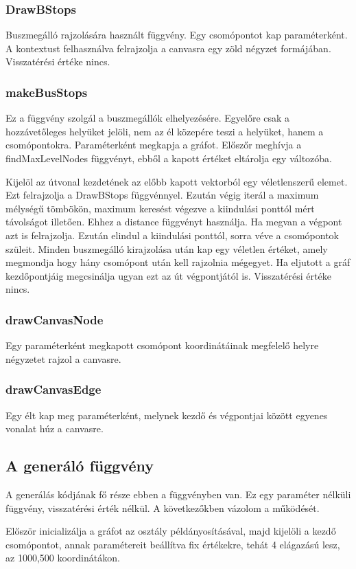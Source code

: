 \subsubsection{DrawBStops}
Buszmegálló rajzolására használt függvény. Egy csomópontot kap paraméterként. A kontextust felhasználva felrajzolja a canvasra egy zöld négyzet formájában. Visszatérési értéke nincs.
\subsubsection{makeBusStops}
Ez a függvény szolgál a buszmegállók elhelyezésére. Egyelőre csak a hozzávetőleges helyüket jelöli, nem az él közepére teszi a helyüket, hanem a csomópontokra. Paraméterként megkapja a gráfot. Előszőr meghívja a findMaxLevelNodes függvényt, ebből a kapott értéket eltárolja egy változóba. 

Kijelöl az útvonal kezdetének az előbb kapott vektorból egy véletlenszerű elemet. Ezt felrajzolja a DrawBStops függvénnyel. Ezután végig iterál a maximum mélységű tömbökön, maximum keresést végezve a kiindulási ponttól mért távolságot illetően. Ehhez a distance függvényt használja. Ha megvan a végpont azt is felrajzolja. 
Ezután elindul a kiindulási ponttól, sorra véve a csomópontok szüleit. Minden buszmegálló kirajzolása után kap egy véletlen értéket, amely megmondja hogy hány csomópont után kell rajzolnia mégegyet. Ha eljutott a gráf kezdőpontjáig megcsinálja ugyan ezt az út végpontjától is. Visszatérési értéke nincs.
\subsubsection{drawCanvasNode}
Egy paraméterként megkapott csomópont koordinátáinak megfelelő helyre négyzetet rajzol a canvasre.
\subsubsection{drawCanvasEdge}
Egy élt kap meg paraméterként, melynek kezdő és végpontjai között egyenes vonalat húz a canvasre.
\subsection{A generáló függvény}
A generálás kódjának fő része ebben a függvényben van. Ez egy paraméter nélküli függvény, visszatérési érték nélkül. A következőkben vázolom a működését. 

Először inicializálja a gráfot az osztály példányosításával, majd kijelöli a kezdő csomópontot, annak paramétereit beállítva fix értékekre, tehát 4 elágazású lesz, az 1000,500 koordinátákon. 

